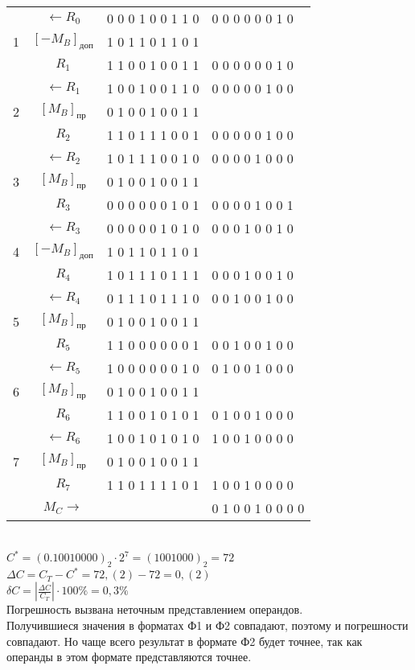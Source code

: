 \documentclass[a4paper, 12pt]{article}
\begin{document}
\begin{enumerate}
\begin{tabular}{|c|c|l|l|}
  	\hline
  	& $\leftarrow R_0$        & 0 0 0 1 0 0 1 1 0 & 0 0 0 0 0 0 1 0 \\
  	1 & $[-M_B]_{\mbox{доп}}$ & 1 0 1 1 0 1 1 0 1 & \\
  	& $R_1$                   & 1 1 0 0 1 0 0 1 1 & 0 0 0 0 0 0 1 0 \\
  	\hline
  	& $\leftarrow R_1$        & 1 0 0 1 0 0 1 1 0 & 0 0 0 0 0 1 0 0 \\
  	2 & $[M_B]_{\mbox{пр}}$   & 0 1 0 0 1 0 0 1 1 & \\
  	& $R_2$                   & 1 1 0 1 1 1 0 0 1 & 0 0 0 0 0 1 0 0 \\
  	\hline
  	& $\leftarrow R_2$        & 1 0 1 1 1 0 0 1 0 & 0 0 0 0 1 0 0 0 \\
  	3 & $[M_B]_{\mbox{пр}}$   & 0 1 0 0 1 0 0 1 1 & \\
  	& $R_3$                   & 0 0 0 0 0 0 1 0 1 & 0 0 0 0 1 0 0 1 \\
  	\hline
  	& $\leftarrow R_3$        & 0 0 0 0 0 1 0 1 0 & 0 0 0 1 0 0 1 0 \\
  	4 & $[-M_B]_{\mbox{доп}}$ & 1 0 1 1 0 1 1 0 1 & \\
  	& $R_4$                   & 1 0 1 1 1 0 1 1 1 & 0 0 0 1 0 0 1 0 \\
  	\hline
  	& $\leftarrow R_4$        & 0 1 1 1 0 1 1 1 0 & 0 0 1 0 0 1 0 0 \\
  	5 & $[M_B]_{\mbox{пр}}$   & 0 1 0 0 1 0 0 1 1 & \\
  	& $R_5$                   & 1 1 0 0 0 0 0 0 1 & 0 0 1 0 0 1 0 0 \\
  	\hline
  	& $\leftarrow R_5$        & 1 0 0 0 0 0 0 1 0 & 0 1 0 0 1 0 0 0 \\
  	6 & $[M_B]_{\mbox{пр}}$   & 0 1 0 0 1 0 0 1 1 & \\
  	& $R_6$                   & 1 1 0 0 1 0 1 0 1 & 0 1 0 0 1 0 0 0 \\
  	\hline
  	& $\leftarrow R_6$        & 1 0 0 1 0 1 0 1 0 & 1 0 0 1 0 0 0 0 \\
  	7 & $[M_B]_{\mbox{пр}}$   & 0 1 0 0 1 0 0 1 1 & \\
  	& $R_7$                   & 1 1 0 1 1 1 1 0 1 & 1 0 0 1 0 0 0 0 \\
  	& $M_C\rightarrow$        &                   & 0 1 0 0 1 0 0 0 0 \\
  	\hline
  \end{tabular}\\
  $C^*=(0.10010000)_2\cdot 2^7=(1001000)_2=72$\\
  $\Delta C=C_T-C^*=72,(2)-72=0,(2)$\\
  $\delta C=\left|\frac{\Delta C}{C_T}\right|\cdot100\%=0,3\%$\\
  Погрешность вызвана неточным представлением операндов.\\
  Получившиеся значения в форматах Ф1 и Ф2 совпадают, поэтому и погрешности совпадают. Но чаще всего результат в формате Ф2 будет точнее, так как операнды в этом формате представляются точнее.
\end{enumerate}
\end{document}
